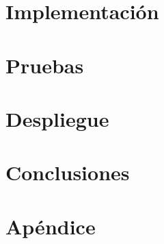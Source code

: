\documentclass[a4paper, 11pt, showtrims]{memoir}
\begin{document}
\chapter{Implementación} \label{ch:implementacion}

\cleardoublepage

\chapter{Pruebas} \label{ch:pruebas}

\cleardoublepage

\chapter{Despliegue} \label{ch:despliegue}

\cleardoublepage

\chapter{Conclusiones} \label{ch:conclusiones}

\cleardoublepage


\backmatter
\appendix

\chapter{Apéndice} \label{ch:apendice}





\end{document}
